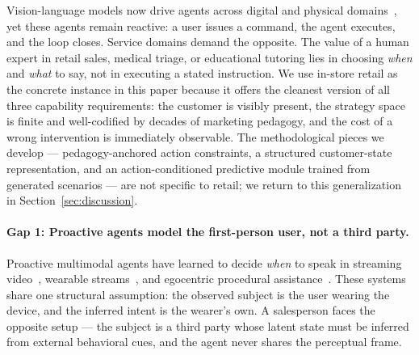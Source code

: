 \documentclass{article}
\begin{document}
Vision-language models now drive agents across digital and physical domains~\cite{Mind2Web,SeeClick,SWEAgent,SayCan,DrHouse}, yet these agents remain reactive: a user issues a command, the agent executes, and the loop closes. Service domains demand the opposite. The value of a human expert in retail sales, medical triage, or educational tutoring lies in choosing \emph{when} and \emph{what} to say, not in executing a stated instruction. We use in-store retail as the concrete instance in this paper because it offers the cleanest version of all three capability requirements: the customer is visibly present, the strategy space is finite and well-codified by decades of marketing pedagogy, and the cost of a wrong intervention is immediately observable. The methodological pieces we develop --- pedagogy-anchored action constraints, a structured customer-state representation, and an action-conditioned predictive module trained from generated scenarios --- are not specific to retail; we return to this generalization in Section~\ref{sec:discussion}.

\paragraph{Gap 1: Proactive agents model the first-person user, not a third party.}
Proactive multimodal agents have learned to decide \emph{when} to speak in streaming video~\cite{MMDuet,MMDuet2,StreamBridge,Dispider,ViSpeak,ProactiveVideoQA}, wearable streams~\cite{ContextAgent,SocialMind}, and egocentric procedural assistance~\cite{ProAssist}. These systems share one structural assumption: the observed subject is the user wearing the device, and the inferred intent is the wearer's own. A salesperson faces the opposite setup --- the subject is a third party whose latent state must be inferred from external behavioral cues, and the agent never shares the perceptual frame.
\end{document}
